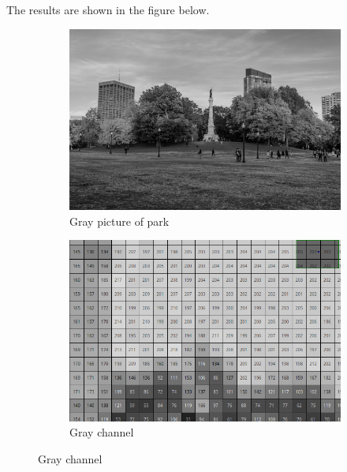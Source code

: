 \documentclass{article}
\begin{document}
      The results are shown in the figure below.

      \begin{figure}[H]
        \centering
        \begin{subfigure}[b]{0.45\textwidth}
        \centering
            \includegraphics[width=\textwidth]{img/Gray_Full.png}
            \caption{Gray picture of park}
            \label{fig:1d}
        \end{subfigure}
        \begin{subfigure}[b]{0.45\textwidth}
        \centering
            \includegraphics[width=\textwidth]{img/Gray_Cropped.png}
            \caption{Gray channel}
            \label{fig:2d}
        \end{subfigure}


\end{figure}
\end{document}
